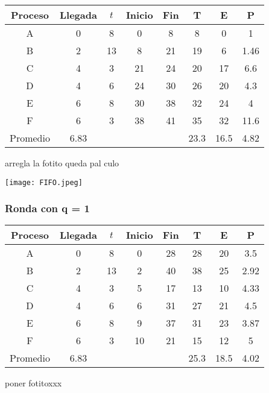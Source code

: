 \documentclass[11pt]{article}
\begin{document}
\begin{center}
\begin{tabular}{|c|c|c|c|c|c|c|c|}
    \hline
    Proceso & Llegada & $t$ & Inicio & Fin & T & E & P \\
    \hline
    A & 0 & 8 & 0 & 8 & 8 & 0 & 1 \\
    \hline
    B & 2 & 13 & 8 & 21 & 19 & 6 & 1.46 \\
    \hline
    C & 4 & 3 & 21 & 24 & 20 & 17 & 6.6 \\
    \hline
    D & 4 & 6 & 24 & 30 & 26 & 20 & 4.3 \\
    \hline
    E & 6 & 8 & 30 & 38 & 32 & 24 & 4 \\
    \hline
    F & 6 & 3 & 38 & 41 & 35 & 32 & 11.6 \\ 
    \hline
    Promedio & 6.83 & & & & 23.3 & 16.5 & 4.82 \\
    \hline
\end{tabular}
\end{center}

arregla la fotito queda pal culo

\texttt{[image: FIFO.jpeg]}

\subsubsection*{Ronda con q = 1}

\begin{center}
    \begin{tabular}{|c|c|c|c|c|c|c|c|}
        \hline
        Proceso & Llegada & $t$ & Inicio & Fin & T & E & P \\
        \hline
        A & 0 & 8 & 0 & 28 & 28 & 20 & 3.5 \\
        \hline
        B & 2 & 13 & 2 & 40 & 38 & 25 & 2.92 \\
        \hline
        C & 4 & 3 & 5 & 17 & 13 & 10 & 4.33 \\
        \hline
        D & 4 & 6 & 6 & 31 & 27 & 21 & 4.5 \\
        \hline
        E & 6 & 8 & 9 & 37 & 31 & 23 & 3.87 \\
        \hline
        F & 6 & 3 & 10 & 21 & 15 & 12 & 5 \\ 
        \hline
        Promedio & 6.83 & & & & 25.3 & 18.5 & 4.02  \\
        \hline
    \end{tabular}
\end{center}

poner fotitoxxx \\
\end{document}
